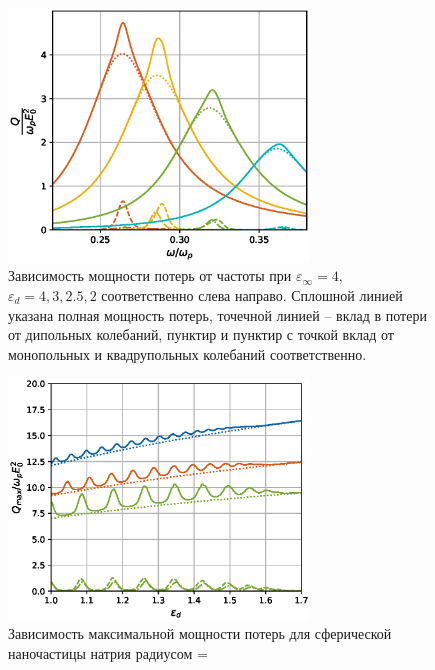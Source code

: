 \documentclass[12pt, a4paper]{article}
\def \eps {\varepsilon}
\begin{document}
\begin{figure}[h]
	\centering
	\includegraphics[width=80mm]{./image/fig1_epsd4.eps}
	\caption{Зависимость мощности потерь от частоты при $\eps_\infty= 4$, $\eps_d = 4, 3, 2.5, 2$ соответственно слева направо. Сплошной линией указана полная мощность потерь, точечной линией – вклад в потери от дипольных колебаний, пунктир и пунктир с точкой вклад от монопольных и квадрупольных колебаний соответственно. }
	\label{fig1_epsd4}
\end{figure} 
\begin{figure}[h]
	\centering
	\includegraphics[width=80mm]{./image/natr2.eps}
	\caption{Зависимость максимальной мощности потерь для сферической наночастицы натрия радиусом =}
	\label{natr}
\end{figure} 
\end{document}
